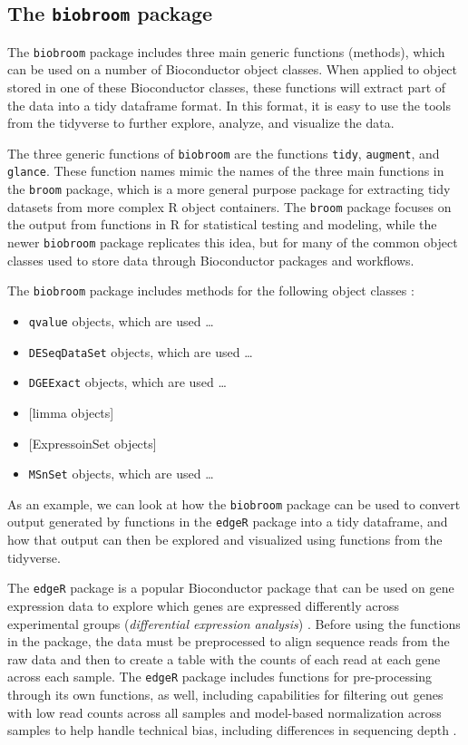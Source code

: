 \documentclass[]{tufte-book}
\providecommand{\tightlist}{%
  \setlength{\itemsep}{0pt}\setlength{\parskip}{0pt}}
\begin{document}
\hypertarget{the-biobroom-package}{%
\subsection{\texorpdfstring{The \texttt{biobroom} package}{The biobroom package}}\label{the-biobroom-package}}

The \texttt{biobroom} package includes three main generic functions (methods), which
can be used on a number of Bioconductor object classes. When applied to object
stored in one of these Bioconductor classes, these functions will extract part
of the data into a tidy dataframe format. In this format, it is easy to use the
tools from the tidyverse to further explore, analyze, and visualize the data.

The three generic functions of \texttt{biobroom} are the functions \texttt{tidy}, \texttt{augment},
and \texttt{glance}. These function names mimic the names of the three main functions
in the \texttt{broom} package, which is a more general purpose package for extracting
tidy datasets from more complex R object containers. The \texttt{broom} package
focuses on the output from functions in R for statistical testing and modeling,
while the newer \texttt{biobroom} package replicates this idea, but for many of the
common object classes used to store data through Bioconductor packages and
workflows.

The \texttt{biobroom} package includes methods for the following object classes
\citep{biobroom}:

\begin{itemize}
\tightlist
\item
  \texttt{qvalue} objects, which are used \ldots{}
\item
  \texttt{DESeqDataSet} objects, which are used \ldots{}
\item
  \texttt{DGEExact} objects, which are used \ldots{}
\item
  {[}limma objects{]}
\item
  {[}ExpressoinSet objects{]}
\item
  \texttt{MSnSet} objects, which are used \ldots{}
\end{itemize}

As an example, we can look at how the \texttt{biobroom} package can be used to
convert output generated by functions in the \texttt{edgeR} package into a tidy
dataframe, and how that output can then be explored and visualized using
functions from the tidyverse.

The \texttt{edgeR} package is a popular Bioconductor package that can be used on gene
expression data to explore which genes are expressed differently across
experimental groups (\emph{differential expression analysis}) \citep{edgeR}. Before using
the functions in the package, the data must be preprocessed to align sequence
reads from the raw data and then to create a table with the counts of each read
at each gene across each sample. The \texttt{edgeR} package includes functions for
pre-processing through its own functions, as well, including capabilities for
filtering out genes with low read counts across all samples and model-based
normalization across samples to help handle technical bias, including
differences in sequencing depth \citep{chen2014edger}.
\end{document}
